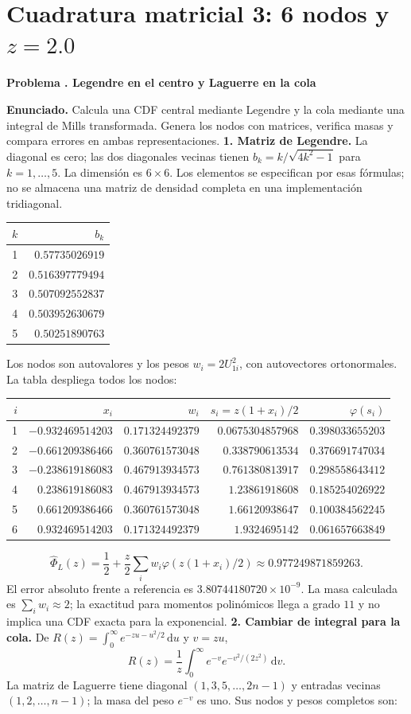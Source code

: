 \documentclass[11pt,a4paper]{article}
\newcommand{\dd}{\,\mathrm d}
\theoremstyle{definition}
\newcounter{problema}
\newenvironment{resuelto}[1]{\refstepcounter{problema}\par\medskip\Needspace{6\baselineskip}\textbf{Problema \theproblema. #1}\par}{\par\medskip}
\begin{document}
\section{\texorpdfstring{Cuadratura matricial 3: 6 nodos y $z=2.0$}{Cuadratura matricial 3: 6 nodos y z=2.0}}
\begin{resuelto}{Legendre en el centro y Laguerre en la cola}
\textbf{Enunciado.} Calcula una CDF central mediante Legendre y la cola mediante una integral de Mills transformada. Genera los nodos con matrices, verifica masas y compara errores en ambas representaciones.
\textbf{1. Matriz de Legendre.} La diagonal es cero; las dos diagonales vecinas tienen $b_k=k/\sqrt{4k^2-1}$ para $k=1,\ldots,5$. La dimensión es $6\times6$. Los elementos se especifican por esas fórmulas; no se almacena una matriz de densidad completa en una implementación tridiagonal.

\begin{center}\small\begin{tabular}{rr}
\toprule
$k$&$b_k$\\
\midrule
1&$0.57735026919$\\
2&$0.516397779494$\\
3&$0.507092552837$\\
4&$0.503952630679$\\
5&$0.50251890763$\\
\bottomrule\end{tabular}\end{center}
Los nodos son autovalores y los pesos $w_i=2U_{1i}^2$, con autovectores ortonormales. La tabla despliega todos los nodos:

\begin{center}\small\begin{tabular}{rrrrr}
\toprule
$i$&$x_i$&$w_i$&$s_i=z(1+x_i)/2$&$\varphi(s_i)$\\
\midrule
1&$-0.932469514203$&$0.171324492379$&$0.0675304857968$&$0.398033655203$\\
2&$-0.661209386466$&$0.360761573048$&$0.338790613534$&$0.376691747034$\\
3&$-0.238619186083$&$0.467913934573$&$0.761380813917$&$0.298558643412$\\
4&$0.238619186083$&$0.467913934573$&$1.23861918608$&$0.185254026922$\\
5&$0.661209386466$&$0.360761573048$&$1.66120938647$&$0.100384562245$\\
6&$0.932469514203$&$0.171324492379$&$1.9324695142$&$0.061657663849$\\
\bottomrule\end{tabular}\end{center}
\[
\widehat\Phi_L(z)=\frac12+\frac z2\sum_iw_i\varphi(z(1+x_i)/2)\approx0.977249871859263.
\]
El error absoluto frente a referencia es $3.80744180720\times10^{-9}$. La masa calculada es $\sum_iw_i\approx2$; la exactitud para momentos polinómicos llega a grado $11$ y no implica una CDF exacta para la exponencial.
\textbf{2. Cambiar de integral para la cola.} De $R(z)=\int_0^\infty e^{-zu-u^2/2}\dd u$ y $v=zu$,
\[
R(z)=\frac1z\int_0^\infty e^{-v}e^{-v^2/(2z^2)}\dd v.
\]
La matriz de Laguerre tiene diagonal $(1,3,5,\ldots,2n-1)$ y entradas vecinas $(1,2,\ldots,n-1)$; la masa del peso $e^{-v}$ es uno. Sus nodos y pesos completos son:


\end{resuelto}
\end{document}
